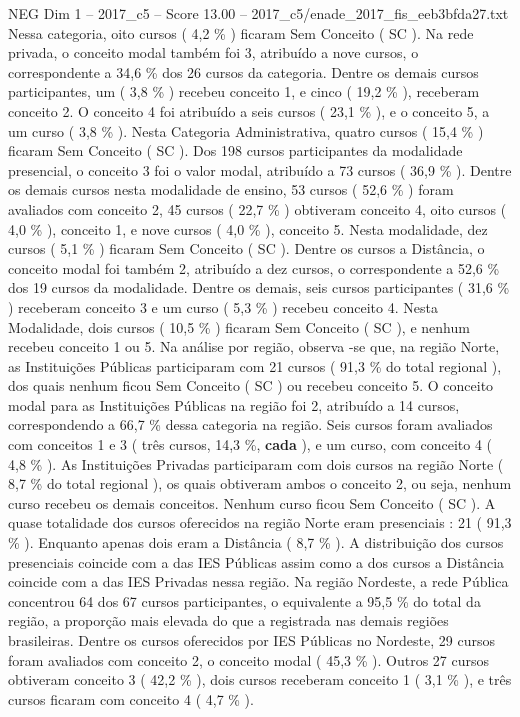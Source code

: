 \begin{textsample}{NEG Dim 1 – 2017\_c5 – Score 13.00 – 2017\_c5/enade\_2017\_fis\_eeb3bfda27.txt}
Nessa categoria, oito cursos ( 4,2 \% ) ficaram Sem Conceito ( SC ).
Na rede privada, o conceito modal também foi 3, atribuído a nove cursos, o correspondente a 34,6 \% dos 26 cursos da categoria.
Dentre os demais cursos participantes, um ( 3,8 \% ) recebeu conceito 1, e cinco ( 19,2 \% ), receberam conceito 2.
O conceito 4 foi atribuído a seis cursos ( 23,1 \% ), e o conceito 5, a um curso ( 3,8 \% ).
Nesta Categoria Administrativa, quatro cursos ( 15,4 \% ) ficaram Sem Conceito ( SC ).
Dos 198 cursos participantes da modalidade presencial, o conceito 3 foi o valor modal, atribuído a 73 cursos ( 36,9 \% ).
Dentre os demais cursos nesta modalidade de ensino, 53 cursos ( 52,6 \% ) foram avaliados com conceito 2, 45 cursos ( 22,7 \% ) obtiveram conceito 4, oito cursos ( 4,0 \% ), conceito 1, e nove cursos ( 4,0 \% ), conceito 5.
Nesta modalidade, dez cursos ( 5,1 \% ) ficaram Sem Conceito ( SC ).
Dentre os cursos a Distância, o conceito modal foi também 2, atribuído a dez cursos, o correspondente a 52,6 \% dos 19 cursos da modalidade.
Dentre os demais, seis cursos participantes ( 31,6 \% ) receberam conceito 3 e um curso ( 5,3 \% ) recebeu conceito 4.
Nesta Modalidade, dois cursos ( 10,5 \% ) ficaram Sem Conceito ( SC ), e nenhum recebeu conceito 1 ou 5.
Na análise por região, observa -se que, na região Norte, as Instituições Públicas participaram com 21 cursos ( 91,3 \% do total regional ), dos quais nenhum ficou Sem Conceito ( SC ) ou recebeu conceito 5.
O conceito modal para as Instituições Públicas na região foi 2, atribuído a 14 cursos, correspondendo a 66,7 \% dessa categoria na região.
Seis cursos foram avaliados com conceitos 1 e 3 ( três cursos, 14,3 \%, \textbf{cada} ), e um curso, com conceito 4 ( 4,8 \% ).
As Instituições Privadas participaram com dois cursos na região Norte ( 8,7 \% do total regional ), os quais obtiveram ambos o conceito 2, ou seja, nenhum curso recebeu os demais conceitos.
Nenhum curso ficou Sem Conceito ( SC ).
A quase totalidade dos cursos oferecidos na região Norte eram presenciais : 21 ( 91,3 \% ).
Enquanto apenas dois eram a Distância ( 8,7 \% ).
A distribuição dos cursos presenciais coincide com a das IES Públicas assim como a dos cursos a Distância coincide com a das IES Privadas nessa região.
Na região Nordeste, a rede Pública concentrou 64 dos 67 cursos participantes, o equivalente a 95,5 \% do total da região, a proporção mais elevada do que a registrada nas demais regiões brasileiras.
Dentre os cursos oferecidos por IES Públicas no Nordeste, 29 cursos foram avaliados com conceito 2, o conceito modal ( 45,3 \% ).
Outros 27 cursos obtiveram conceito 3 ( 42,2 \% ), dois cursos receberam conceito 1 ( 3,1 \% ), e três cursos ficaram com conceito 4 ( 4,7 \% ).

\end{textsample}
